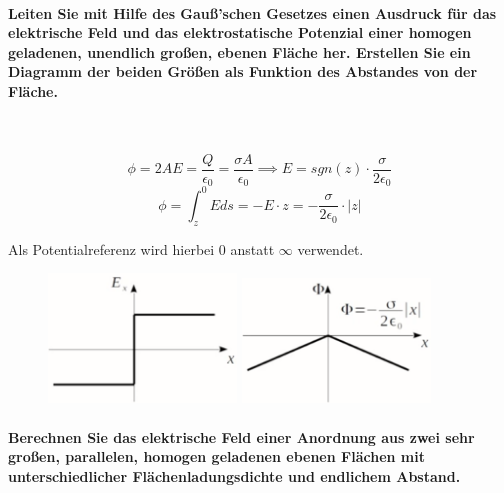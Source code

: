 \documentclass[a4paper, 11pt, ngerman, parskip=half-]{scrartcl}
\begin{document}
\paragraph{Leiten Sie mit Hilfe des Gauß'schen Gesetzes einen Ausdruck für das elektrische Feld und
    das elektrostatische Potenzial einer homogen geladenen, unendlich großen, ebenen Fläche
    her. Erstellen Sie ein Diagramm der beiden Größen als Funktion des Abstandes von der
    Fläche.} ~

\begin{equation}
    \phi = 2 A E = \frac{Q}{\epsilon_0} = \frac{\sigma A}{\epsilon_0}
    \implies
    E = sgn(z) \cdot \frac{\sigma}{2 \epsilon_0}
\end{equation}
\begin{equation}
    \phi = \int_{z}^0 E ds = - E \cdot z = - \frac{\sigma}{2 \epsilon_0} \cdot |z|
\end{equation}

Als Potentialreferenz wird hierbei $0$ anstatt $\infty$ verwendet.

\begin{figure}[H]
    \centering
    \begin{minipage}[b]{0.3\textwidth}
        \centering
        \includegraphics[width=5cm]{image/01/10.1}
    \end{minipage}
    \hspace{2cm}
    \begin{minipage}[b]{0.3\textwidth}
        \centering
        \includegraphics[width=5cm]{image/01/10.2}
    \end{minipage}
\end{figure}

\paragraph{Berechnen Sie das elektrische Feld einer Anordnung aus zwei sehr großen, parallelen,
    homogen geladenen ebenen Flächen mit unterschiedlicher Flächenladungsdichte und
    endlichem Abstand.} ~
\end{document}
